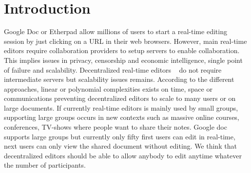 
\section{Introduction}



Google Doc or Etherpad allow millions of users to start a real-time
editing session by just clicking on a URL in their web
browsers. However, main real-time editors require collaboration
providers to setup servers to enable
collaboration. This implies issues in privacy, censorship and economic
intelligence, single point of failure and
scalability. 
Decentralized real-time editors ~\cite{oster2006data,
  sun1998operational, sun2009contextbased} do not require intermediate
servers but scalability issues remains. According to the different
approaches, linear or polynomial complexities exists on time, space or
communications preventing decentralized editors to scale to many
users or on large documents. If currently real-time editors is mainly
used by small groups, supporting large groups occurs in new contexts
such as massive online courses, conferences, TV-shows where
people want to share their notes. Google doc supports large groups but
currently only fifty first users can edit in real-time, next users can
only view the shared document without editing. We think that
decentralized editors should be able to allow anybody to edit anytime
whatever the number of participants.


